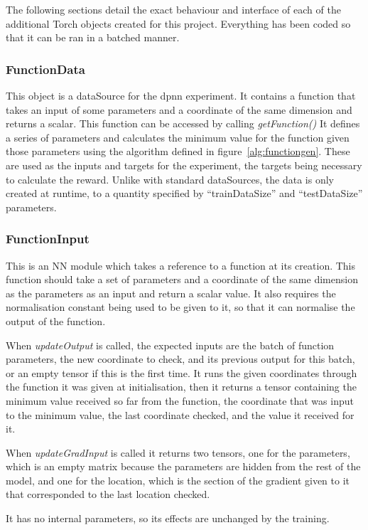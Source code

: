 The following sections detail the exact behaviour and interface of each of the additional Torch objects created for this project. Everything has been coded so that it can be ran in a batched manner.

\subsubsection{FunctionData}
This object is a dataSource for the dpnn experiment. It contains a function that takes an input of some parameters and a coordinate of the same dimension and returns a scalar. This function can be accessed by calling \emph{getFunction()} It defines a series of parameters and calculates the minimum value for the function given those parameters using the algorithm defined in figure~\ref{alg:functiongen}. These are used as the inputs and targets for the experiment, the targets being necessary to calculate the reward. Unlike with standard dataSources, the data is only created at runtime, to a quantity specified by ``trainDataSize'' and ``testDataSize'' parameters.

\subsubsection{FunctionInput}
This is an NN module which takes a reference to a function at its creation. This function should take a set of parameters and a coordinate of the same dimension as the parameters as an input and return a scalar value. It also requires the normalisation constant being used to be given to it, so that it can normalise the output of the function.

 When \emph{updateOutput} is called, the expected inputs are the batch of function parameters, the new coordinate to check, and its previous output for this batch, or an empty tensor if this is the first time. It runs the given coordinates through the function it was given at initialisation, then it returns a tensor containing the minimum value received so far from the function, the coordinate that was input to the minimum value, the last coordinate checked, and the value it received for it.

When \emph{updateGradInput} is called it returns two tensors, one for the parameters, which is an empty matrix because the parameters are hidden from the rest of the model, and one for the location, which is the section of the gradient given to it that corresponded to the last location checked.

It has no internal parameters, so its effects are unchanged by the training.
